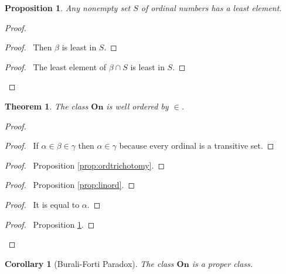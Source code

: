 \documentclass{book}
\let\qed\relax
\newtheorem{prop}[ax]{Proposition}
\newtheorem{cor}{Corollary}[ax]
\newtheorem{thm}[ax]{Theorem}
\theoremstyle{definition}
\begin{document}
\begin{prop}
\label{prop:ordwellord}
Any nonempty set $S$ of ordinal numbers has a least element.
\end{prop}

\begin{proof}
\pf
{}
\begin{proof}
	\pf\ Then $\beta$ is least in $S$.
\end{proof}
\begin{proof}
	\pf\ The least element of $\beta \cap S$ is least in $S$.
\end{proof}
\qed
\end{proof}

\begin{thm}
\label{thm:Onwellord}
The class $\mathbf{On}$ is well ordered by $\in$.
\end{thm}

\begin{proof}
\pf
{}
\begin{proof}
	\pf\ If $\alpha \in \beta \in \gamma$ then $\alpha \in \gamma$ because every ordinal is a transitive set.
\end{proof}
\begin{proof}
	\pf\ Proposition \ref{prop:ordtrichotomy}.
\end{proof}
\begin{proof}
	\pf\ Proposition \ref{prop:linord}.
\end{proof}
\begin{proof}
	\pf\ It is equal to $\alpha$.
\end{proof}
\begin{proof}
	\pf\ Proposition \ref{prop:ordwellord}.
\end{proof}
\qed
\end{proof}

\begin{cor}[Burali-Forti Paradox]
The class $\mathbf{On}$ is a proper class.
\end{cor}
\end{document}

